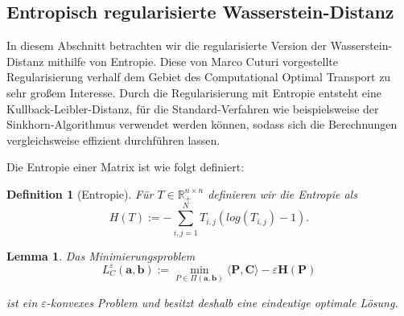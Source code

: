 \documentclass[twoside, 12pt,a4paper]{book}
\newtheorem{lemma}[theorem]{Lemma}
\newtheorem{definition}[theorem]{Definition}
\numberwithin{equation}{section}
\begin{document}
	\subsection{Entropisch regularisierte Wasserstein-Distanz}
	In diesem Abschnitt betrachten wir die regularisierte Version der Wasserstein-Distanz mithilfe von Entropie. 
	Diese von Marco Cuturi vorgestellte Regularisierung \cite{cuturi2013sinkhorn} verhalf dem Gebiet des Computational Optimal Transport zu sehr großem Interesse. Durch die Regularisierung mit Entropie entsteht eine Kullback-Leibler-Distanz, für die Standard-Verfahren wie beispielsweise der Sinkhorn-Algorithmus verwendet werden können, sodass sich die Berechnungen vergleichsweise effizient durchführen lassen.\\

	
	\noindent Die Entropie einer Matrix ist wie folgt definiert:
	
	\begin{definition}[Entropie]
		Für $T \in \mathbb{R}_{+}^{n \times n}$ definieren wir die Entropie als
		\begin{equation}
		H(T) := - \sum_{i,j=1}^N{T_{i,j}(log(T_{i,j})-1)}.
		\end{equation}
	\end{definition}
	

	\begin{lemma} Das Minimierungsproblem
		\begin{equation}
		L_C^\varepsilon(\boldsymbol{a}, \boldsymbol{b}):= \min_{P \in \Pi(\boldsymbol{a}, \boldsymbol{b})}{\langle \boldsymbol{P}, \boldsymbol{C} \rangle - \varepsilon \boldsymbol{H}(\boldsymbol{P})}\label{eq:reg_problem}	
		\end{equation}
		
		
		\noindent ist ein $\varepsilon$-konvexes Problem und besitzt deshalb eine eindeutige optimale Lösung.
		
	\end{lemma}
\end{document}
